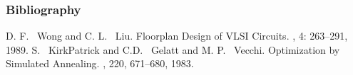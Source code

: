 \documentclass[xcolor=pdftex,dvipsnames,table]{beamer}
\begin{document}

\begin{frame}
  \frametitle{Bibliography}
  \begin{thebibliography}{8}
       D. F. ~Wong and C. L. ~Liu.
       \newblock Floorplan Design of VLSI Circuits.
       , 4: 263--291, 1989.
       S. ~KirkPatrick and C.D. ~Gelatt and M. P. ~Vecchi.
       \newblock Optimization by Simulated Annealing.
       , 220, 671--680, 1983.
  \end{thebibliography}
\end{frame}
\end{document}
